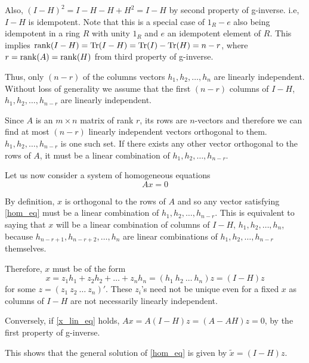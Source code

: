 \documentclass[10pt, a4paper]{article}
\begin{document}
Also, \( (I-H)^{2} = I - H - H + H^{2} = I - H \) by second property of g-inverse. i.e, \( I-H \) is idempotent.
Note that this is a special case of \( 1_{R} - e \) also being idempotent in a ring \( R \) with unity \( 1_{R} \) and \( e \) an idempotent element of \( R \). 
This implies \( \operatorname{rank}(I-H) = \operatorname{Tr}(I-H) = \operatorname{Tr}(I) - \operatorname{Tr}(H) = n - r \), where \( r = \operatorname{rank}(A) = \operatorname{rank}(H) \) from third property of g-inverse.

Thus, only \( (n-r) \) of the columns vectors \( h_{1}, h_{2}, \dots, h_{n} \) are linearly independent. Without loss of generality we assume that the first \( (n-r) \) columns of \( I-H \), \( h_{1}, h_{2}, \dots, h_{n-r} \) are linearly independent.

Since \( A \) is an \( m \times n \) matrix of rank \( r \), its rows are \( n \)-vectors and therefore we can find at most \( (n-r) \) linearly independent vectors orthogonal to them. \( h_{1}, h_{2}, \dots, h_{n-r} \) is one such set. If there exists any other vector orthogonal to the rows of \( A \), it must be a linear combination of \( h_{1}, h_{2}, \dots, h_{n-r} \).

Let us now consider a system of homogeneous equations
\begin{equation}
	Ax = 0 \label{hom_eq}
\end{equation}

By definition, \( x \) is orthogonal to the rows of \( A \) and so any vector satisfying \eqref{hom_eq} must be a linear combination of \( h_{1}, h_{2}, \dots, h_{n-r} \).
This is equivalent to saying that \( x \) will be a linear combination of columns of \( I-H \), \( h_{1}, h_{2}, \dots, h_{n} \), because \( h_{n-r+1}, h_{n-r+2}, \dots, h_{n} \) are linear combinations of \( h_{1}, h_{2}, \dots, h_{n-r} \) themselves.

Therefore, \( x \) must be of the form
\begin{equation}
	x = z_{1}h_{1} + z_{2}h_{2} + \dots + z_{n}h_{n} = (h_{1}\ h_{2}\ \dots \ h_{n})z = (I-H)z \label{x_lin_eq}
\end{equation}
for some \( z = (z_{1}\ z_{2}\ \dots \ z_{n})' \).
These \( z_{i} \)'s need not be unique even for a fixed \( x \) as columns of \( I - H \) are not necessarily linearly independent.

Conversely, if \eqref{x_lin_eq}  holds, \( Ax = A(I-H)z = (A-AH)z = 0 \), by the first property of g-inverse.

This shows that the general solution of \eqref{hom_eq} is given by \( \widetilde{x} = (I-H)z \).
\end{document}
